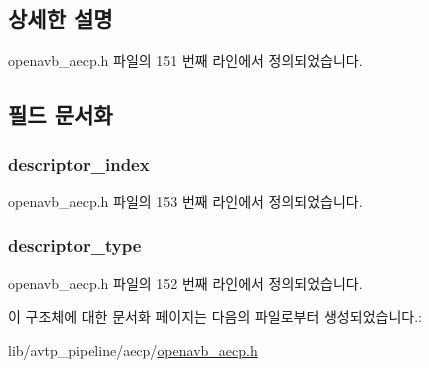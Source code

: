 \subsection{상세한 설명}


openavb\+\_\+aecp.\+h 파일의 151 번째 라인에서 정의되었습니다.



\subsection{필드 문서화}
\subsubsection[{\texorpdfstring{descriptor\+\_\+index}{descriptor_index}}]{ descriptor\+\_\+index}\hypertarget{structopenavb__aecp__command__data__get__stream__info__t_ab26fb363c24b9a2a4391f9171c981b08}{}\label{structopenavb__aecp__command__data__get__stream__info__t_ab26fb363c24b9a2a4391f9171c981b08}


openavb\+\_\+aecp.\+h 파일의 153 번째 라인에서 정의되었습니다.

\subsubsection[{\texorpdfstring{descriptor\+\_\+type}{descriptor_type}}]{ descriptor\+\_\+type}\hypertarget{structopenavb__aecp__command__data__get__stream__info__t_a1e231d7874aada5925b29affc76782cc}{}\label{structopenavb__aecp__command__data__get__stream__info__t_a1e231d7874aada5925b29affc76782cc}


openavb\+\_\+aecp.\+h 파일의 152 번째 라인에서 정의되었습니다.



이 구조체에 대한 문서화 페이지는 다음의 파일로부터 생성되었습니다.\+:\begin{DoxyCompactItemize}
\item 
lib/avtp\+\_\+pipeline/aecp/\hyperlink{openavb__aecp_8h}{openavb\+\_\+aecp.\+h}\end{DoxyCompactItemize}
